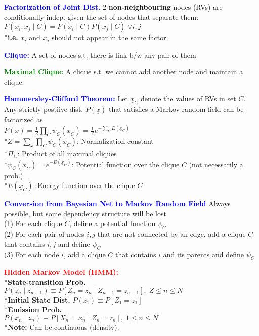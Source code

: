 \documentclass[5pt]{extarticle} %
\begin{document}
\begin{paracol}{3}
{    \textcolor{blue}{\textbf{Factorization of Joint Dist.}} 2 \textbf{non-neighbouring} nodes (RVs) are conditionally indep. given the set of nodes that separate them: \\
    $P(x_i, x_j \mid C) = P(x_i \mid C) P(x_j \mid C) \; \forall i,j$ \\
    *\textbf{i.e.} $x_i$ and $x_j$ should not appear in the same factor. 

    \textcolor{blue}{\textbf{Clique:}} A set of nodes s.t. there is link b/w any pair of them

    \textcolor{green}{\textbf{Maximal Clique:}} A clique s.t. we cannot add another node and maintain a clique. 

    \textcolor{blue}{\textbf{Hammersley-Clifford Theorem:}} Let $\underline{x}_C$ denote the values of RVs in set $C$. Any strictly postiive dist. $P(\underline{x})$ that satisfies a Markov random field can be factorized as \\
    $P(\underline{x}) = \frac{1}{Z} \prod_{C} \psi_C(\underline{x}_C) = \frac{1}{Z} e^{-\sum_C E(\underline{x}_C)}$ \\
    *$Z= \sum_{\underline{x}} \prod_C \psi_C (\underline{x}_C)$: Normalization constant \\
    *$\Pi_C$: Product of all maximal cliques \\
    *$\psi_C(\underline{x}_C) = e^{-E(\underline{x}_C)}$: Potential function over the clique $C$ (not necessarily a prob.) \\
    *$E(\underline{x}_C)$: Energy function over the clique $C$ 

    \textcolor{blue}{\textbf{Conversion from Bayesian Net to Markov Random Field}} Always possible, but some dependency structure will be lost \\
    (1) For each clique $C$, define a potential function $\psi_C$ \\
    (2) For each pair of nodes $i,j$ that are not connected by an edge, add a clique $C$ that contains $i,j$ and define $\psi_C$ \\
    (3) For each node $i$, add a clique $C$ that contains $i$ and its parents and define $\psi_C$

    \textcolor{red}{\textbf{Hidden Markov Model (HMM):}} \\
    *\textbf{State-transition Prob.} \\ 
    $P(z_n \mid z_{n-1}) \equiv P[Z_n = z_n \mid Z_{n-1} = z_{n-1}], \; Z \leq n \leq N$ \\
    *\textbf{Initial State Dist.} $P(z_1) \equiv P[Z_1 = z_1]$ \\
    *\textbf{Emission Prob.} \\
    $P(x_n \mid z_n) \equiv P[X_n = x_n \mid Z_n = z_n], \; 1 \leq n \leq N$ \\
    *\textbf{Note:} Can be continuous (density).

}
\end{paracol}
\end{document}
